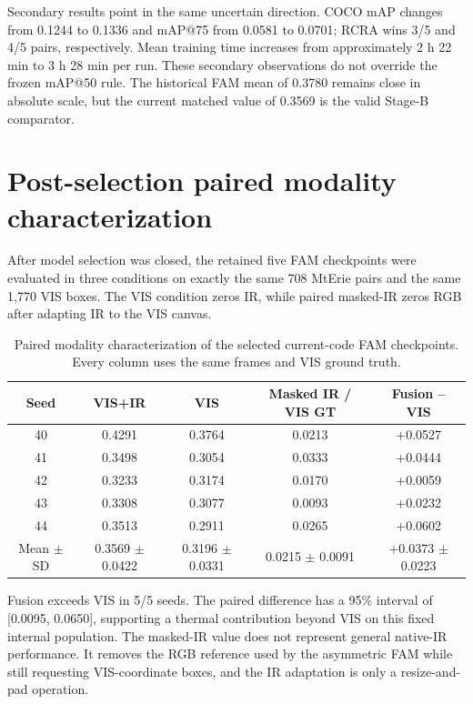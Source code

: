 Secondary results point in the same uncertain direction. COCO mAP changes from
0.1244 to 0.1336 and mAP@75 from 0.0581 to 0.0701; RCRA wins 3/5 and 4/5 pairs,
respectively. Mean training time increases from approximately 2 h 22 min to
3 h 28 min per run. These secondary observations do not override the frozen
mAP@50 rule. The historical FAM mean of 0.3780 remains close in absolute
scale, but the current matched value of 0.3569 is the valid Stage-B comparator.

\section{Post-selection paired modality characterization}
\label{sec:paired-modality-audit}

After model selection was closed, the retained five FAM checkpoints were
evaluated in three conditions on exactly the same 708 MtErie pairs and the same
1,770 VIS boxes. The VIS condition zeros IR, while paired masked-IR zeros RGB
after adapting IR to the VIS canvas.

\begin{table}[htbp]
  \centering
  \caption{Paired modality characterization of the selected current-code FAM
  checkpoints. Every column uses the same frames and VIS ground truth.}
  \label{tab:paired-fam-modalities}
  \small
  \begin{tabular}{@{}ccccc@{}}
    \toprule
    Seed & VIS+IR & VIS & Masked IR / VIS GT & Fusion -- VIS \\
    \midrule
    40 & 0.4291 & 0.3764 & 0.0213 & +0.0527 \\
    41 & 0.3498 & 0.3054 & 0.0333 & +0.0444 \\
    42 & 0.3233 & 0.3174 & 0.0170 & +0.0059 \\
    43 & 0.3308 & 0.3077 & 0.0093 & +0.0232 \\
    44 & 0.3513 & 0.2911 & 0.0265 & +0.0602 \\
    \midrule
    Mean \(\pm\) SD
      & 0.3569 \(\pm\) 0.0422
      & 0.3196 \(\pm\) 0.0331
      & 0.0215 \(\pm\) 0.0091
      & +0.0373 \(\pm\) 0.0223 \\
    \bottomrule
  \end{tabular}
\end{table}

Fusion exceeds VIS in 5/5 seeds. The paired difference has a 95\% interval of
[0.0095, 0.0650], supporting a thermal contribution beyond VIS on this fixed
internal population. The masked-IR value does not represent general native-IR
performance. It removes the RGB reference used by the asymmetric FAM while
still requesting VIS-coordinate boxes, and the IR adaptation is only a
resize-and-pad operation.

